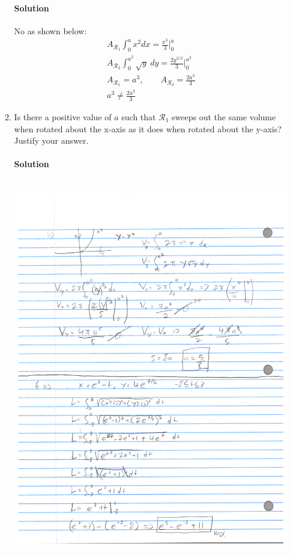 \documentclass[MATH-115-Notes.tex]{subfiles}
\begin{document}
\begin{enumerate}
\begin{enumerate}
        \paragraph{Solution}
        No as shown below:
        \begin{gather*}
            A_{\mathcal{R}_1}\int_{0}^{a} x^2 dx = \frac{x^3}{3}\Big|_0^a\\
            A_{\mathcal{R}_2}\int_{0}^{a^2} \sqrt{y}\ dy = \frac{2y^{3/2}}{3}\Big|_0^{a^2}\\
            A_{\mathcal{R}_1} = a^3,\qquad A_{\mathcal{R}_2} = \frac{2a^3}{3} \\
            a^3 \neq \frac{2a^3}{3} 
        \end{gather*}

        \item Is there a positive value of $a$ such that $\mathcal{R}_1$ sweeps out the same volume when rotated about the x-axis as it does when rotated about the y-axis? Justify your answer.
        \paragraph{Solution}~\\
        {\centering\includegraphics[trim={0 14cm 0 0},clip,scale=0.33]{./figures/math-final-work006.jpg}\\}
    \end{enumerate}
    

\end{enumerate}
\end{document}

